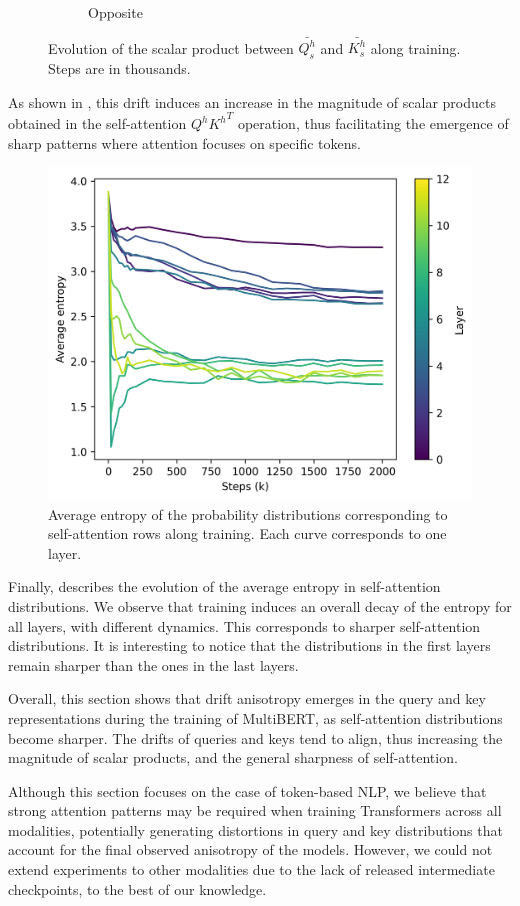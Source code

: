 \begin{figure}[ht]
\begin{subfigure}[b]{0.48\columnwidth}
         \caption{Opposite}
         \label{fig:scalar_opp}
    \end{subfigure}
    \caption{Evolution of the scalar product between $\bar{Q^h_s}$ and $\bar{K^h_s}$ along training. Steps are in thousands.}
    \label{fig:scalar_QK}
\end{figure}

As shown in , this drift induces an increase in the magnitude of scalar products obtained in the self-attention $Q^h{K^h}^T$ operation, thus facilitating the emergence of sharp patterns where attention focuses on specific tokens.

\begin{figure}[ht]
    \centering
    \includegraphics[width=0.5\linewidth]{sources/part_1/anisotropy/imgs/entropy_decay.png}
    \caption{Average entropy of the probability distributions corresponding to self-attention rows along training. Each curve corresponds to one layer.}
    \label{fig:entropy_decay}
\end{figure}

Finally,  describes the evolution of the average entropy in self-attention distributions. We observe that training induces an overall decay of the entropy for all layers, with different dynamics. This corresponds to sharper self-attention distributions. It is interesting to notice that the distributions in the first layers remain sharper than the ones in the last layers.

Overall, this section shows that drift anisotropy emerges in the query and key representations during the training of MultiBERT, as self-attention distributions become sharper. The drifts of queries and keys tend to align, thus increasing the magnitude of scalar products, and the general sharpness of self-attention.

Although this section focuses on the case of token-based NLP, we believe that strong attention patterns may be required when training Transformers across all modalities, potentially generating distortions in query and key distributions that account for the final observed anisotropy of the models. However, we could not extend experiments to other modalities due to the lack of released intermediate checkpoints, to the best of our knowledge.

